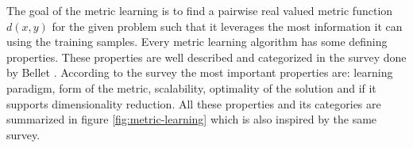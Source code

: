 \documentclass[12pt,a4paper]{report}
\begin{document}
The goal of the metric learning is to find a pairwise real valued metric function $d(x,y)$ for the given problem such that it leverages the most information it can using the training samples. Every metric learning algorithm has some defining properties. These properties are well described and categorized in the survey done by Bellet \citep{bellet2013survey}. According to the survey the most important properties are: learning paradigm, form of the metric, scalability, optimality of the solution and if it supports dimensionality reduction. All these properties and its categories are summarized in figure \ref{fig:metric-learning} which is also inspired by the same survey.

\end{document}
